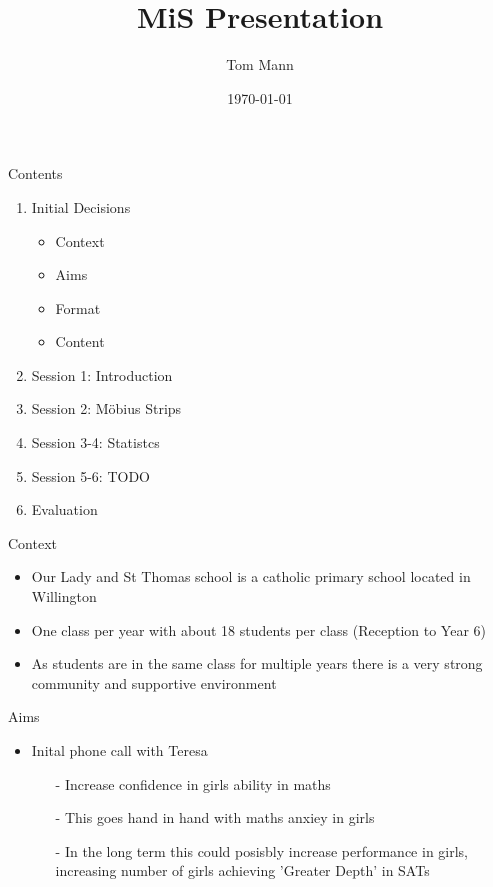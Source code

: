 \documentclass{beamer}  %
\title{MiS Presentation}
\author{Tom Mann}
\date{\today}
\begin{document}
\begin{frame}
    \titlepage
\end{frame}

\begin{frame}{Contents}
    
    
    \begin{enumerate}
        \item Initial Decisions
        \begin{itemize}
            \item Context
            \item Aims
            \item Format
            \item Content
        \end{itemize}
        \item Session 1: Introduction
        \item Session 2: M\"{o}bius Strips
        \item Session 3-4: Statistcs
        \item Session 5-6: TODO
        \item Evaluation
    \end{enumerate}
\end{frame}

\begin{frame}{Context}
    \begin{itemize}
        \item Our Lady and St Thomas school is a catholic primary school located in Willington 
        \item One class per year with about 18 students per class (Reception to Year 6)
        \item As students are in the same class for multiple years there is a very strong community and supportive environment
    \end{itemize}
\end{frame}

\begin{frame}{Aims}
    \begin{itemize}
        \item Inital phone call with Teresa
            \begin{itemize}
                \item[-]Increase confidence in girls ability in maths
                \item[-] This goes hand in hand with maths anxiey in girls
                \item[-] In the long term this could posisbly increase performance in girls, increasing number of girls achieving 'Greater Depth' in SATs
            \end{itemize}
    \end{itemize}
\end{frame}
\end{document}
